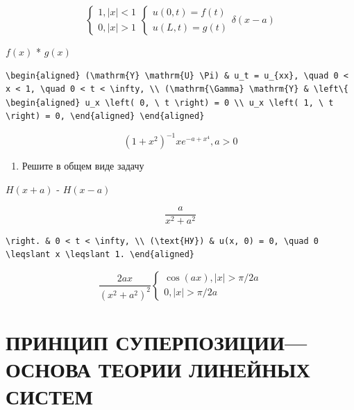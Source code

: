 \documentclass[
  ukrainian,
]{article}
\providecommand{\tightlist}{%
  \setlength{\itemsep}{0pt}\setlength{\parskip}{0pt}}
\begin{document}
\[
\begin{cases} 1, |x| < 1 \\ 0, |x| > 1 \end{cases}
\begin{cases} u(0, t) = f(t) \\ u(L, t) = g(t) \end{cases}
\delta(x-a)
\]

\(f(x)\) * \(g(x)\)

\begin{verbatim}
\begin{aligned} (\mathrm{Y} \mathrm{U} \Pi) & u_t = u_{xx}, \quad 0 < x < 1, \quad 0 < t < \infty, \\ (\mathrm{\Gamma} \mathrm{Y} & \left\{ \begin{aligned} u_x \left( 0, \ t \right) = 0 \\ u_x \left( 1, \ t \right) = 0, \end{aligned} \end{aligned}
\end{verbatim}

\[
(1+x^2)^{-1}
xe^{-a+x^4}, a > 0
\]

\begin{enumerate}
\def\labelenumi{\arabic{enumi}.}
\setcounter{enumi}{1}
\tightlist
\item
  Решите в общем виде задачу
\end{enumerate}

\(H(x+a)\) - \(H(x-a)\)

\[
\frac{a}{x^2+a^2}
\]

\begin{verbatim}
\right. & 0 < t < \infty, \\ (\text{НУ}) & u(x, 0) = 0, \quad 0 \leqslant x \leqslant 1. \end{aligned}
\end{verbatim}

\[
\frac{2ax}{(x^2+a^2)^2}
\begin{cases} \cos(ax), |x| > \pi/2a \\ 0, |x| > \pi/2a \end{cases}
\]

\section{ПРИНЦИП СУПЕРПОЗИЦИИ--- ОСНОВА ТЕОРИИ ЛИНЕЙНЫХ
СИСТЕМ}\label{ux43fux440ux438ux43dux446ux438ux43f-ux441ux443ux43fux435ux440ux43fux43eux437ux438ux446ux438ux438-ux43eux441ux43dux43eux432ux430-ux442ux435ux43eux440ux438ux438-ux43bux438ux43dux435ux439ux43dux44bux445-ux441ux438ux441ux442ux435ux43c}
\end{document}
